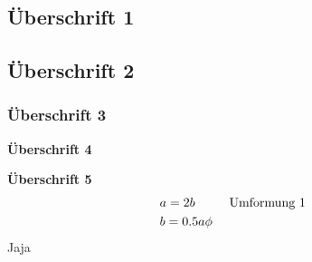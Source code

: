 \documentclass[12pt, a4paper, twoside, titlepage]{article}
\begin{document}
\begin{flushleft}
\section{ Überschrift 1 }
\subsection{ Überschrift 2 }
\subsubsection{ Überschrift 3 }
\end{flushleft}
\center
\large\textbf{ Überschrift 4 }
\normalsize
\endcenter
\begin{flushleft}
\textbf{ Überschrift 5 }\\

\begin{align*}
&a = 2b &&\text{  Umformung 1 }\\
& b = 0.5 a \phi &&\text{\quad}\\
\end{align*}
Jaja
\end{flushleft}
\end{document}
